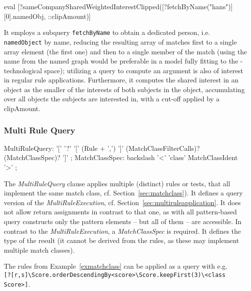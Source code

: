 \begin{example}
  \begin{grshell}
eval [?sameCompanySharedWeightedInterestClipped([?fetchByName("hans")][0].namedObj, ::clipAmount)]
  \end{grshell}
	
It employs a subquery \texttt{fetchByName} to obtain a dedicated person, i.e. \texttt{namedObject} by name, reducing the resulting array of matches first to a single array element (the first one) and then to a single member of the match (using the name from the named graph would be preferable in a model fully fitting to the \GrG-technological space); utilizing a query to compute an argument is also of interest in regular rule applications.
Furthermore, it computes the shared interest in an object as the smaller of the interests of both subjects in the object, accumulating over all objects the subjects are interested in, with a cut-off applied by a clipAmount.
\end{example}

\subsubsection*{Multi Rule Query}

\begin{rail}
  MultiRuleQuery: '[' '?' '[' (Rule + ',') ']' (MatchClassFilterCalls)? (MatchClassSpec)? ']' ;
	MatchClassSpec: backslash '<' 'class' MatchClassIdent '>' ;
\end{rail}

The \emph{MultiRuleQuery} clause applies multiple (distinct) rules or tests, that all implement the same match class, cf. Section~\ref{sec:matchclass}).
It defines a query version of the \emph{MultiRuleExecution}, cf. Section~\ref{sec:multiruleapplication}.
It does not allow return assignments in contrast to that one, as with all pattern-based query constructs only the pattern elements -- but all of them -- are accessible.
In contrast to the \emph{MultiRuleExecution}, a \emph{MatchClassSpec} is required. 
It defines the type of the result (it cannot be derived from the rules, as these may implement multiple match classes).

\begin{example}
The rules from Example~\ref{exmatchclass} can be applied as a query with e.g. \\
\verb#[?[r,s]\Score.orderDescendingBy<score>\Score.keepFirst(3)\<class Score>]#.
\end{example}


